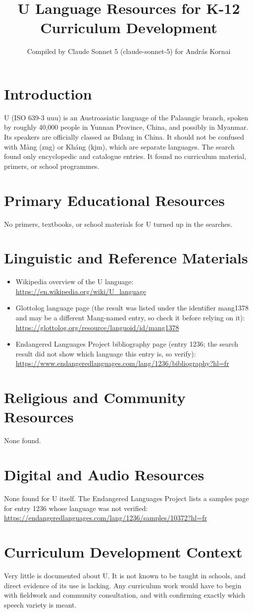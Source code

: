 \documentclass[12pt]{article}
\title{U Language Resources for K-12 Curriculum Development}
\author{Compiled by Claude Sonnet 5 (claude-sonnet-5) for Andr\'as Kornai}
\date{}
\begin{document}
\maketitle

\section{Introduction}
U (ISO 639-3 uuu) is an Austroasiatic language of the Palaungic branch, spoken by roughly 40,000 people in Yunnan Province, China, and possibly in Myanmar. Its speakers are officially classed as Bulang in China. It should not be confused with M\h{a}ng (zng) or Kh\'ang (kjm), which are separate languages. The search found only encyclopedic and catalogue entries. It found no curriculum material, primers, or school programmes.

\section{Primary Educational Resources}
No primers, textbooks, or school materials for U turned up in the searches.

\section{Linguistic and Reference Materials}
\begin{itemize}
\item Wikipedia overview of the U language: \url{https://en.wikipedia.org/wiki/U_language}
\item Glottolog language page (the result was listed under the identifier mang1378 and may be a different Mang-named entry, so check it before relying on it): \url{https://glottolog.org/resource/languoid/id/mang1378}
\item Endangered Languages Project bibliography page (entry 1236; the search result did not show which language this entry is, so verify): \url{https://www.endangeredlanguages.com/lang/1236/bibliography?hl=fr}
\end{itemize}

\section{Religious and Community Resources}
None found.

\section{Digital and Audio Resources}
None found for U itself. The Endangered Languages Project lists a samples page for entry 1236 whose language was not verified: \url{https://endangeredlanguages.com/lang/1236/samples/10372?hl=fr}

\section{Curriculum Development Context}
Very little is documented about U. It is not known to be taught in schools, and direct evidence of its use is lacking. Any curriculum work would have to begin with fieldwork and community consultation, and with confirming exactly which speech variety is meant.
\end{document}
